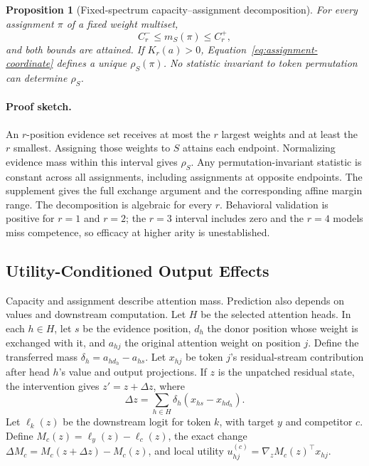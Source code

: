 \documentclass[letterpaper]{article} %
\newtheorem{proposition}{Proposition}
\begin{document}
\begin{center}
\end{center}

\begin{proposition}[Fixed-spectrum capacity--assignment decomposition]
For every assignment $\pi$ of a fixed weight multiset,
\begin{equation}
 C_r^-\le m_S(\pi)\le C_r^+,
\end{equation}
and both bounds are attained. If $K_r(a)>0$, Equation~\ref{eq:assignment-coordinate} defines a unique
$\rho_S(\pi)$. No statistic invariant to token permutation can determine $\rho_S$.
\label{prop:capacity}
\end{proposition}

\paragraph{Proof sketch.}
An $r$-position evidence set receives at most the $r$ largest weights and at least the $r$ smallest. Assigning
those weights to $S$ attains each endpoint. Normalizing evidence mass within this interval gives $\rho_S$.
Any permutation-invariant statistic is constant across all assignments, including assignments at opposite
endpoints. The supplement gives the full exchange argument and the corresponding affine margin range.
The decomposition is algebraic for every $r$. Behavioral validation is positive for $r=1$ and $r=2$; the
$r=3$ interval includes zero and the $r=4$ models miss competence, so efficacy at higher arity is unestablished.

\subsection{Utility-Conditioned Output Effects}

Capacity and assignment describe attention mass. Prediction also depends on values and downstream
computation. Let $H$ be the selected attention heads. In each $h\in H$, let $s$ be the evidence position,
$d_h$ the donor position whose weight is exchanged with it, and $a_{hj}$ the original attention weight on
position $j$. Define the transferred mass $\delta_h=a_{h d_h}-a_{h s}$. Let $x_{hj}$ be token $j$'s
residual-stream contribution after head $h$'s value and output projections. If $z$ is the unpatched residual
state, the intervention gives $z'=z+\Delta z$, where
\begin{equation}
 \Delta z=\sum_{h\in H}\delta_h(x_{hs}-x_{hd_h}).
\label{eq:residual-change}
\end{equation}
Let $\ell_k(z)$ be the downstream logit for token $k$, with target $y$ and competitor $c$. Define
$M_c(z)=\ell_y(z)-\ell_c(z)$, the exact change $\Delta M_c=M_c(z+\Delta z)-M_c(z)$, and local utility
$u_{hj}^{(c)}=\nabla_z M_c(z)^\top x_{hj}$.
\end{document}
